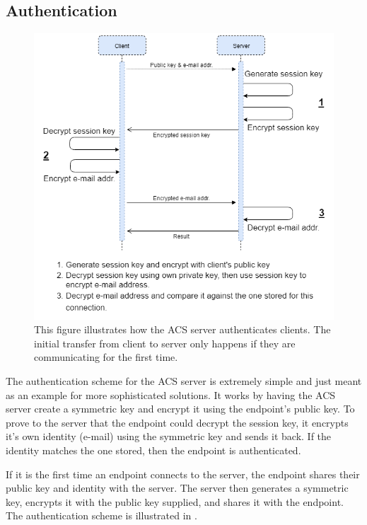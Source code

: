 	\subsection{Authentication}
	\label{sec:wsprot_auth}
		\begin{figure}[th]
		  \centering
		  \includegraphics[width=\textwidth]{Figures/ACS_Prot/ACS_server_auth}
		  \decoRule
		  \caption[ACS server authentication scheme]{This figure illustrates how the ACS server authenticates clients. The initial transfer from client to server only happens if they are communicating for the first time.}
		  \label{fig:ACS_serv_auth}
		\end{figure}
		The authentication scheme for the ACS server is extremely simple and just meant as an example for more sophisticated solutions. It works by having the ACS server create a symmetric key and encrypt it using the endpoint's public key. To prove to the server that the endpoint could decrypt the session key, it encrypts it's own identity (e-mail) using the symmetric key and sends it back. If the identity matches the one stored, then the endpoint is authenticated.

		If it is the first time an endpoint connects to the server, the endpoint shares their public key and identity with the server. The server then generates a symmetric key, encrypts it with the public key supplied, and shares it with the endpoint. The authentication scheme is illustrated in .
		
